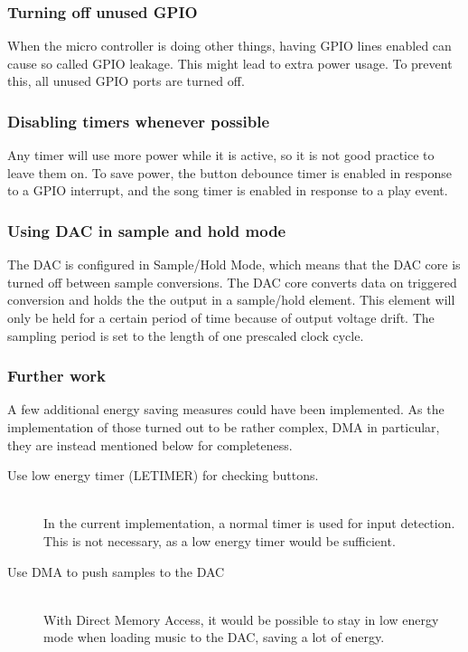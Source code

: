 \subsubsection{Turning off unused GPIO}
When the micro controller is doing other things, having GPIO lines enabled can cause so called GPIO leakage.
This might lead to extra power usage.
To prevent this, all unused GPIO ports are turned off.

\subsubsection{Disabling timers whenever possible}
Any timer will use more power while it is active, so it is not good practice to leave them on.
To save power, the button debounce timer is enabled in response to a GPIO interrupt, and the song timer is enabled in response to a play event. 

\subsubsection{Using DAC in sample and hold mode}
The DAC is configured in Sample/Hold Mode, which means that the DAC core is turned off between sample conversions.
The DAC core converts data on triggered conversion and holds the the output in a sample/hold element.
This element will only be held for a certain period of time because of output voltage drift.
The sampling period is set to the length of one prescaled clock cycle.

\subsubsection{Further work}
A few additional energy saving measures could have been implemented.
As the implementation of those turned out to be rather complex, DMA in particular, they are instead mentioned below for completeness.

\begin{description}
  \item[Use low energy timer (LETIMER) for checking buttons.] \hfill \\
        In the current implementation, a normal timer is used for input detection. This is not necessary, as a low energy timer would be sufficient. 
  \item[Use DMA to push samples to the DAC] \hfill \\ \label{DMA} 
        With Direct Memory Access, it would be possible to stay in low energy mode when loading music to the DAC, saving a lot of energy.
\end{description}



